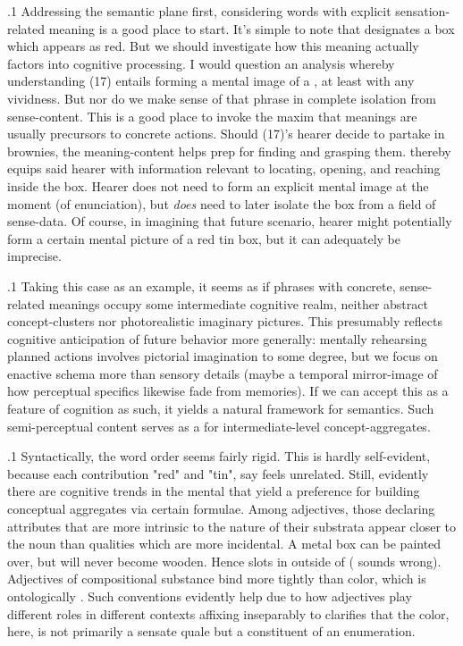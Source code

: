 \documentclass[11pt, twocolumn]{article}
\begin{document}
\p.1{%
Addressing the semantic plane first, considering words with
explicit sensation-related meaning is a good place to start.
It's simple to note that  designates a box which
appears as red.  But we should investigate how this
meaning actually factors into cognitive processing.  I would
question an analysis whereby understanding \exsRef(17) entails forming a
mental image of a , at least with any
vividness.  But nor do we make sense of that phrase in
complete isolation from sense-content.  This is a good
place to invoke the maxim that meanings are usually precursors
to concrete actions.  Should \exsRef(17)'s hearer decide to partake in
brownies, the meaning-content helps prep for finding and grasping them.
 thereby equips said hearer with
information relevant to locating, opening, and reaching inside the box.
Hearer does not need to form an explicit mental image at the moment
(of enunciation), but \textit{does} need to later isolate the box from
a field of sense-data.  Of course, in imagining that future scenario,
hearer might potentially form a certain mental picture of a red tin box,
but it can adequately be imprecise.
} %

\p.1{%
Taking this case as an example, it seems as if phrases
with concrete, sense-related meanings occupy some intermediate
cognitive realm, neither abstract concept-clusters nor
photorealistic imaginary pictures.  This presumably reflects
cognitive anticipation of future behavior more generally: mentally
rehearsing planned actions involves pictorial imagination to
some degree, but we focus on enactive schema more than sensory
details (maybe a temporal mirror-image of how perceptual
specifics likewise fade from memories).
If we can accept this as a feature of cognition as such, it yields a
natural framework for semantics.  Such semi-perceptual content
serves as a  for intermediate-level concept-aggregates.
} %

\p.1{%
Syntactically, the word order seems fairly rigid.  This
is hardly self-evident, because each contribution
\mdash{} "red" and "tin", say \mdash{} feels unrelated.  Still,
evidently there are cognitive trends in the mental
 that yield a preference for
building conceptual aggregates via certain formulae.
Among adjectives, those declaring attributes that are
more intrinsic to the nature of their substrata appear
closer to the noun than qualities which are more
incidental.  A metal box can be painted over, but will
never become wooden.  Hence  slots in
outside of  ( sounds wrong).
Adjectives of compositional substance bind more
tightly than color, which is ontologically .
Such conventions evidently help due to
how adjectives play different roles in different
contexts \mdash{} affixing  inseparably to
 clarifies that the color, here, is not
primarily a sensate quale but a constituent of an enumeration.
} %
\end{document}
